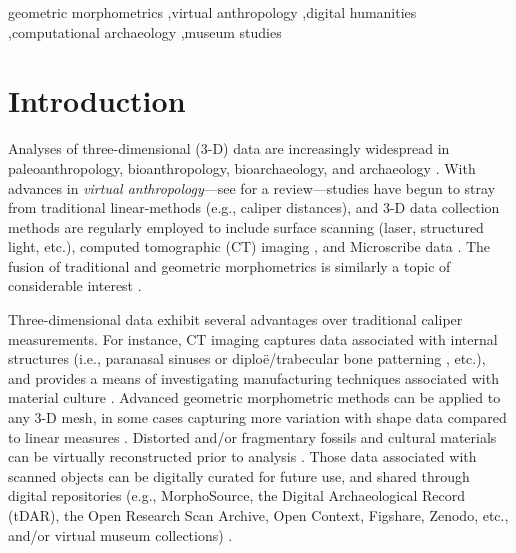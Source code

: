 \documentclass[review]{elsarticle}
\begin{document}
\begin{frontmatter}
\begin{keyword}
geometric morphometrics \sep virtual anthropology \sep digital humanities \sep computational archaeology \sep museum studies
\end{keyword}

\end{frontmatter}
\newpage
\linenumbers
\section{Introduction}

Analyses of three-dimensional (3-D) data are increasingly widespread in paleoanthropology, bioanthropology, bioarchaeology, and archaeology \citep{RN1746,RN5887,RN303,RN1735,RN5900}. With advances in \textit{virtual anthropology}---see \citet{RN5902} for a review---studies have begun to stray from traditional linear-methods (e.g., caliper distances), and 3-D data collection methods are regularly employed to include surface scanning (laser, structured light, etc.), computed tomographic (CT) imaging \citep{RN11489}, and Microscribe data \citep{RN11487}. The fusion of traditional and geometric morphometrics is similarly a topic of considerable interest \citep{RN11945}.

Three-dimensional data exhibit several advantages over traditional caliper measurements. For instance, CT imaging captures data associated with internal structures (i.e., paranasal sinuses \citep{RN5882,RN11490} or diploë/trabecular bone patterning \citep{RN5885,RN5884}, etc.), and provides a means of investigating manufacturing techniques associated with material culture \citep{RN5891}. Advanced geometric morphometric methods can be applied to any 3-D mesh, in some cases capturing more variation with shape data compared to linear measures \citep{RN5880,RN5888}. Distorted and/or fragmentary fossils and cultural materials can be virtually reconstructed prior to analysis \citep{RN5889,Heid1,RN5903,RN5904,RN8985}. Those data associated with scanned objects can be digitally curated for future use, and shared through digital repositories (e.g., MorphoSource, the Digital Archaeological Record (tDAR), the Open Research Scan Archive, Open Context, Figshare, Zenodo, etc., and/or virtual museum collections) \citep{RN5881,RN5890,RN5587,RN5922,RN11522}.
\end{document}
